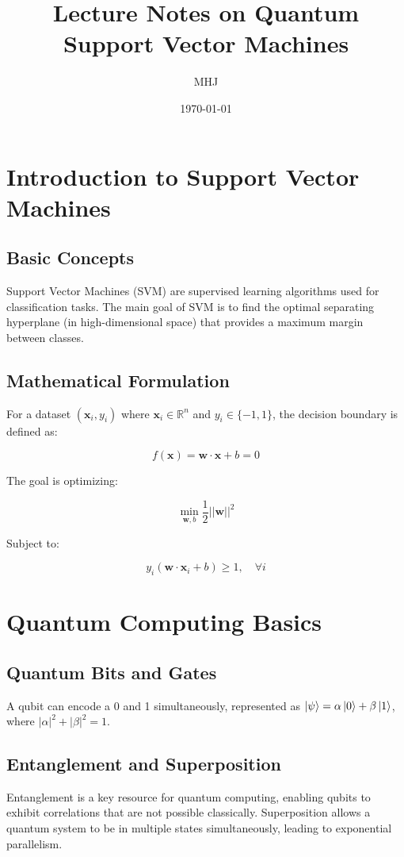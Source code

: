 \documentclass{article}
\title{Lecture Notes on Quantum Support Vector Machines}
\author{MHJ}
\date{\today}
\begin{document}
\maketitle

\tableofcontents
\newpage

\section{Introduction to Support Vector Machines}

\subsection{Basic Concepts}
Support Vector Machines (SVM) are supervised learning algorithms used for classification tasks. The main goal of SVM is to find the optimal separating hyperplane (in high-dimensional space) that provides a maximum margin between classes.

\subsection{Mathematical Formulation}
For a dataset \((\mathbf{x}_i, y_i)\) where \(\mathbf{x}_i \in \mathbb{R}^n\) and \(y_i \in \{-1, 1\}\), the decision boundary is defined as:

\[ f(\mathbf{x}) = \mathbf{w} \cdot \mathbf{x} + b = 0 \]

The goal is optimizing:

\[
\min_{\mathbf{w}, b} \frac{1}{2} ||\mathbf{w}||^2
\]

Subject to:

\[
y_i (\mathbf{w} \cdot \mathbf{x}_i + b) \geq 1, \quad \forall i
\]

\section{Quantum Computing Basics}

\subsection{Quantum Bits and Gates}
A qubit can encode a 0 and 1 simultaneously, represented as \(\ket{\psi} = \alpha\ket{0} + \beta\ket{1}\), where \(|\alpha|^2 + |\beta|^2 = 1\).

\subsection{Entanglement and Superposition}
Entanglement is a key resource for quantum computing, enabling qubits to exhibit correlations that are not possible classically. Superposition allows a quantum system to be in multiple states simultaneously, leading to exponential parallelism.
\end{document}
